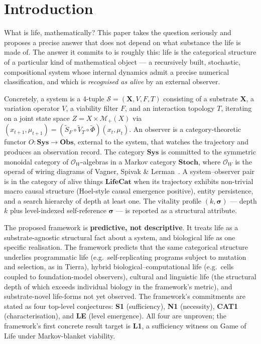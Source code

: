 \documentclass[journal]{IEEEtran}
\theoremstyle{plain}
\theoremstyle{definition}
\theoremstyle{plain}
\newcommand{\Mplus}{\mathcal{M}_{+}}
\begin{document}
\section{Introduction}

What is life, mathematically? This paper takes the question seriously and
proposes a precise answer that does not depend on what substance the life
is made of. The answer it commits to is roughly this: life is the
categorical structure of a particular kind of mathematical object --- a
recursively built, stochastic, compositional system whose internal dynamics
admit a precise numerical classification, and which is \emph{recognised as
alive} by an external observer.

Concretely, a system is a 4-tuple $\mathcal{S} = (\mathbf{X}, V, F, T)$
consisting of a substrate $\mathbf{X}$, a variation operator $V$, a
viability filter $F$, and an interaction topology $T$, iterating on a joint
state space $Z = X \times \Mplus(X)$ via
$(x_{t+1}, \mu_{t+1}) = (\widetilde S_F \circ \widetilde V_T \circ
\widetilde\Phi)(x_t, \mu_t)$. An observer is a category-theoretic functor
$O : \mathbf{Sys} \to \mathbf{Obs}$, external to the system, that watches
the trajectory and produces an observation record. The category $\mathbf{Sys}$
is committed to the symmetric monoidal category of $\mathcal{O}_W$-algebras
in a Markov category $\mathbf{Stoch}$, where $\mathcal{O}_W$ is the operad
of wiring diagrams of Vagner, Spivak \& Lerman~\cite{vagner2015algebras}.
A system--observer pair is in the category of alive things
$\mathbf{LifeCat}$ when its trajectory exhibits non-trivial macro causal
structure (Hoel-style causal emergence positive), entity persistence, and
a search hierarchy of depth at least one. The vitality profile
$(k, \boldsymbol{\sigma})$ --- depth $k$ plus level-indexed self-reference
$\boldsymbol{\sigma}$ --- is reported as a structural attribute.

The proposed framework is \textbf{predictive, not descriptive}. It treats
life as a substrate-agnostic structural fact about a system, and biological
life as one specific realisation. The framework predicts that the same
categorical structure underlies programmatic life (e.g.\ self-replicating
programs subject to mutation and selection, as in Tierra), hybrid
biological--computational life (e.g.\ cells coupled to foundation-model
observers), cultural and linguistic life (the structural depth of which
exceeds individual biology in the framework's metric), and substrate-novel
life-forms not yet observed. The framework's commitments are stated as
four top-level conjectures: \textbf{S1} (sufficiency), \textbf{N1}
(necessity), \textbf{CAT1} (characterisation), and \textbf{LE} (level
emergence). All four are unproven; the framework's first concrete result
target is \textbf{L1}, a sufficiency witness on Game of Life under
Markov-blanket viability.
\end{document}
